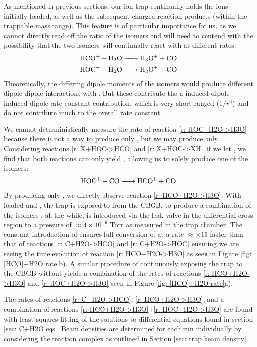 As mentioned in previous sections, our ion trap continually holds the ions initially loaded, as well as the subsequent charged reaction products (within the trappable mass range). This feature is of particular importance for us, as we cannot directly read off the ratio of the isomers and will need to contend with the possibility that the two isomers will continually react with  at different rates:
\begin{align}
	\ce{HCO+ + H2O & -> H3O+ + CO} \label{r: HCO+H2O->H3O} \\
	\ce{HOC+ + H2O & -> H3O+ + CO} \label{r: HOC+H2O->H3O}
\end{align}
Theoretically, the differing dipole moments of the isomers would produce different dipole-dipole interactions with . But these contribute the a induced dipole-induced dipole rate constant contribution, which is very short ranged ($1/r^6$) and do not contribute much to the overall rate constant.

We cannot deterministically measure the rate of reaction \ref{r: HOC+H2O->H3O} because there is not a way to produce only , but we may produce only . Considering reactions \ref{r: X+HOC->HCO} and \ref{r: X+HOC->XH}, if we let , we find that both reactions can only yield , allowing us to solely produce one of the isomers:
\begin{equation}
	\ce{HOC+ + CO -> HCO+ + CO} \label{r: HOC+CO->HCO}
\end{equation}
By producing only , we directly observe reaction \ref{r: HCO+H2O->H3O}. With loaded  and , the trap is exposed to  from the CBGB, to produce a combination of the isomers \ce{[HCO]+}, all the while,  is introduced via the leak valve in the differential cross region to a pressure of $\approx 4 \times 10^{-9}$ Torr as measured in the trap chamber. The constant introduction of  ensures full conversion of  at a rate $\approx \times 10$ faster than that of reactions \ref{r: C+H2O->HCO} and \ref{r: C+H2O->HOC} ensuring we are seeing the time evolution of reaction \ref{r: HCO+H2O->H3O} as seen in Figure \ref{fig: [HCO]+H2O rate}b). A similar procedure of continuously exposing the trap to the CBGB without  yields a combination of the rates of reactions \ref{r: HCO+H2O->H3O} and \ref{r: HOC+H2O->H3O} seen in Figure \ref{fig: [HCO]+H2O rate}a).

The rates of reactions \ref{r: C+H2O->HCO}, \ref{r: HCO+H2O->H3O}, and a combination of reactions \ref{r: HCO+H2O->H3O}+\ref{r: HOC+H2O->H3O} are found with least-squares fitting of the solutions to differential equations found in section \ref{sec: C+H2O eqs}. Beam densities are determined for each run individually by considering the  reaction complex as outlined in Section \ref{sec: trap beam density}.

